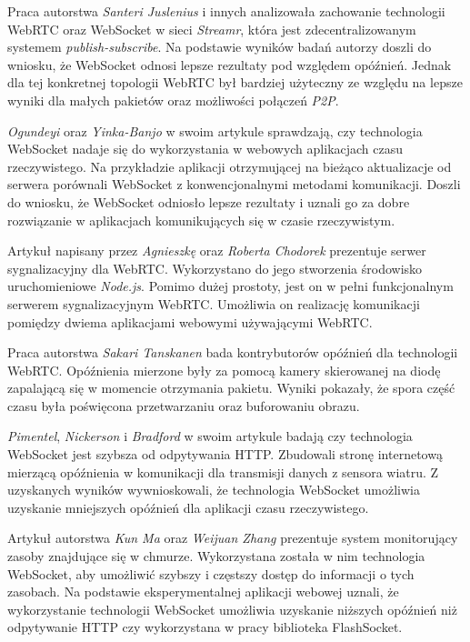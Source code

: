 \documentclass[language=polish,type=master]{aghmodern}
\begin{document}
Praca \cite{websocket_webrtc_streamr} autorstwa \emph{Santeri Juslenius} i innych analizowała zachowanie technologii WebRTC oraz WebSocket w sieci \emph{Streamr}, która jest zdecentralizowanym systemem \emph{publish-subscribe}\footnotemark{}.
Na podstawie wyników badań autorzy doszli do wniosku, że WebSocket odnosi lepsze rezultaty pod względem opóźnień.
Jednak dla tej konkretnej topologii WebRTC był bardziej użyteczny ze względu na lepsze wyniki dla małych pakietów oraz możliwości połączeń \emph{P2P}\footnotemark{}.

\emph{Ogundeyi} oraz \emph{Yinka-Banjo} w swoim artykule \cite{websocket_realtime} sprawdzają, czy technologia WebSocket nadaje się do wykorzystania w webowych aplikacjach czasu rzeczywistego.
Na przykładzie aplikacji otrzymującej na bieżąco aktualizacje od serwera porównali WebSocket z konwencjonalnymi metodami komunikacji.
Doszli do wniosku, że WebSocket odniosło lepsze rezultaty i uznali go za dobre rozwiązanie w aplikacjach komunikujących się w czasie rzeczywistym.

Artykuł \cite{webrtc_signaling} napisany przez \emph{Agnieszkę} oraz \emph{Roberta Chodorek} prezentuje serwer sygnalizacyjny dla WebRTC.
Wykorzystano do jego stworzenia środowisko uruchomieniowe \emph{Node.js}.
Pomimo dużej prostoty, jest on w pełni funkcjonalnym serwerem sygnalizacyjnym WebRTC.
Umożliwia on realizację komunikacji pomiędzy dwiema aplikacjami webowymi używającymi WebRTC.

Praca \cite{webrtc_latency} autorstwa \emph{Sakari Tanskanen} bada kontrybutorów opóźnień dla technologii WebRTC.
Opóźnienia mierzone były za pomocą kamery skierowanej na diodę zapalającą się w momencie otrzymania pakietu.
Wyniki pokazały, że spora część czasu była poświęcona przetwarzaniu oraz buforowaniu obrazu.

\emph{Pimentel}, \emph{Nickerson} i \emph{Bradford} w swoim artykule \cite{websocket_sensor} badają czy technologia WebSocket jest szybsza od odpytywania HTTP.
Zbudowali stronę internetową mierzącą opóźnienia w komunikacji dla transmisji danych z sensora wiatru.
Z uzyskanych wyników wywnioskowali, że technologia WebSocket umożliwia uzyskanie mniejszych opóźnień dla aplikacji czasu rzeczywistego.

Artykuł \cite{websocket_monitoring} autorstwa \emph{Kun Ma} oraz \emph{Weijuan Zhang} prezentuje system monitorujący zasoby znajdujące się w chmurze.
Wykorzystana została w nim technologia WebSocket, aby umożliwić szybszy i częstszy dostęp do informacji o tych zasobach.
Na podstawie eksperymentalnej aplikacji webowej uznali, że wykorzystanie technologii WebSocket umożliwia uzyskanie niższych opóźnień niż odpytywanie HTTP czy wykorzystana w pracy biblioteka FlashSocket.
\end{document}
